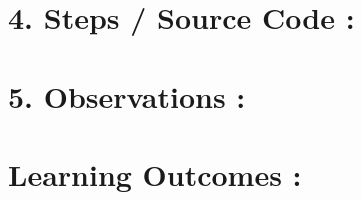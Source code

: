\documentclass[14pt]{extarticle}
\begin{document}
\newpage
\section*{\normalsize 4. Steps / Source Code :}

\begin{enumerate}
\end{enumerate}

%  

\section*{\normalsize 5. Observations :}

\section*{\normalsize Learning Outcomes :}
  
        \begin{itemize}
        \end{itemize}



\end{document}
